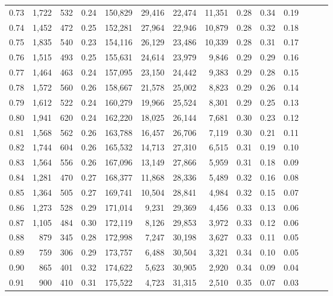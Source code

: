 \begin{tabular}{rrrrrrrrrrrrrr}
0.73 &  1,722 &  532 &  0.24 &  150,829 &   29,416 &  22,474 &  11,351 &  0.28 &  0.34 &      0.19 \\
0.74 &  1,452 &  472 &  0.25 &  152,281 &   27,964 &  22,946 &  10,879 &  0.28 &  0.32 &      0.18 \\
0.75 &  1,835 &  540 &  0.23 &  154,116 &   26,129 &  23,486 &  10,339 &  0.28 &  0.31 &      0.17 \\
0.76 &  1,515 &  493 &  0.25 &  155,631 &   24,614 &  23,979 &   9,846 &  0.29 &  0.29 &      0.16 \\
0.77 &  1,464 &  463 &  0.24 &  157,095 &   23,150 &  24,442 &   9,383 &  0.29 &  0.28 &      0.15 \\
0.78 &  1,572 &  560 &  0.26 &  158,667 &   21,578 &  25,002 &   8,823 &  0.29 &  0.26 &      0.14 \\
0.79 &  1,612 &  522 &  0.24 &  160,279 &   19,966 &  25,524 &   8,301 &  0.29 &  0.25 &      0.13 \\
0.80 &  1,941 &  620 &  0.24 &  162,220 &   18,025 &  26,144 &   7,681 &  0.30 &  0.23 &      0.12 \\
0.81 &  1,568 &  562 &  0.26 &  163,788 &   16,457 &  26,706 &   7,119 &  0.30 &  0.21 &      0.11 \\
0.82 &  1,744 &  604 &  0.26 &  165,532 &   14,713 &  27,310 &   6,515 &  0.31 &  0.19 &      0.10 \\
0.83 &  1,564 &  556 &  0.26 &  167,096 &   13,149 &  27,866 &   5,959 &  0.31 &  0.18 &      0.09 \\
0.84 &  1,281 &  470 &  0.27 &  168,377 &   11,868 &  28,336 &   5,489 &  0.32 &  0.16 &      0.08 \\
0.85 &  1,364 &  505 &  0.27 &  169,741 &   10,504 &  28,841 &   4,984 &  0.32 &  0.15 &      0.07 \\
0.86 &  1,273 &  528 &  0.29 &  171,014 &    9,231 &  29,369 &   4,456 &  0.33 &  0.13 &      0.06 \\
0.87 &  1,105 &  484 &  0.30 &  172,119 &    8,126 &  29,853 &   3,972 &  0.33 &  0.12 &      0.06 \\
0.88 &    879 &  345 &  0.28 &  172,998 &    7,247 &  30,198 &   3,627 &  0.33 &  0.11 &      0.05 \\
0.89 &    759 &  306 &  0.29 &  173,757 &    6,488 &  30,504 &   3,321 &  0.34 &  0.10 &      0.05 \\
0.90 &    865 &  401 &  0.32 &  174,622 &    5,623 &  30,905 &   2,920 &  0.34 &  0.09 &      0.04 \\
0.91 &    900 &  410 &  0.31 &  175,522 &    4,723 &  31,315 &   2,510 &  0.35 &  0.07 &      0.03 \\

\end{tabular}
